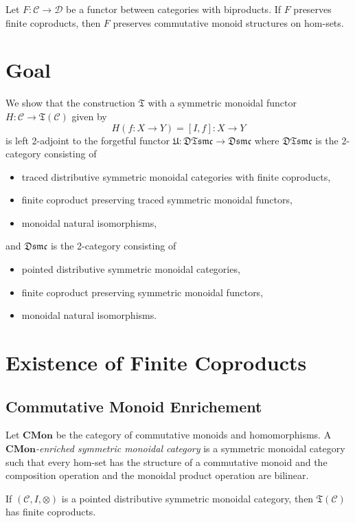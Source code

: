 \begin{proposition}
  Let $F \colon \mathcal{C} \to \mathcal{D}$ be a functor between
  categories with biproducts. If $F$ preserves finite coproducts,
  then $F$ preserves commutative monoid structures on hom-sets.
\end{proposition}

\section{Goal}

We show that
the construction $\mathfrak{T}$ with a symmetric monoidal functor
$H \colon \mathcal{C} \to \mathfrak{T}(\mathcal{C})$ given by
\begin{equation*}
  H(f \colon X \to Y) = [I,f] \colon X \to Y
\end{equation*}
is left 2-adjoint to the forgetful functor
$\mathfrak{U} \colon \mathfrak{DTsmc} \to \mathfrak{Dsmc}$
where $\mathfrak{DTsmc}$ is the 2-category consisting of
\begin{itemize}
\item traced distributive symmetric monoidal categories with
  finite coproducts,
\item finite coproduct preserving traced symmetric monoidal functors,
\item monoidal natural isomorphisms,
\end{itemize}
and $\mathfrak{Dsmc}$ is the 2-category consisting of
\begin{itemize}
\item pointed distributive symmetric monoidal categories,
\item finite coproduct preserving symmetric monoidal functors,
\item monoidal natural isomorphisms.
\end{itemize}

\section{Existence of Finite Coproducts}

\subsection{Commutative Monoid Enrichement}

Let $\mathbf{CMon}$ be the category of commutative monoids and
homomorphisms. A \emph{$\mathbf{CMon}$-enriched symmetric monoidal
  category} is a symmetric monoidal category such that every
hom-set has the structure of a commutative monoid and the composition
operation and the monoidal product operation are bilinear.
\begin{theorem}
  If $(\mathcal{C},I,\otimes)$ is a pointed distributive symmetric
  monoidal category, then $\mathfrak{T}(\mathcal{C})$ has finite
  coproducts.
\end{theorem}

